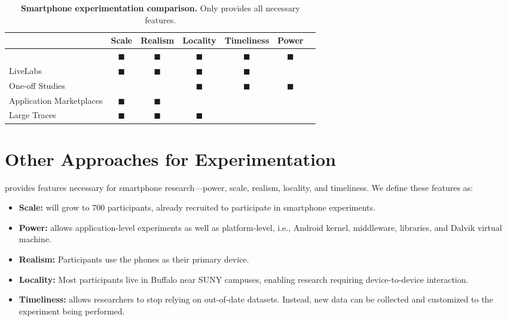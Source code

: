 \begin{table*}[t]
\begin{tabularx}{\textwidth}{Xcccccc}
& {\normalsize{\textbf{Scale}}} &
{\normalsize{\textbf{Realism}}} &
{\normalsize{\textbf{Locality}}} &
{\normalsize{\textbf{Timeliness}}} &
{\normalsize{\textbf{Power}}} \\
\toprule

{\large \PhoneLab{}}
& $\blacksquare$ & $\blacksquare$ & $\blacksquare$ & $\blacksquare$ & $\blacksquare$ \\
\toprule

LiveLabs &
$\blacksquare$ & $\blacksquare$ & $\blacksquare$ & $\blacksquare$ & & \\
\midrule

One-off Studies &
& & $\blacksquare$ & $\blacksquare$ & $\blacksquare$ \\
\midrule

Application Marketplaces &
$\blacksquare$ & $\blacksquare$ & & & \\
\midrule

Large Traces &
$\blacksquare$ & $\blacksquare$ & $\blacksquare$ & & \\
\bottomrule

\end{tabularx}
\caption{\textbf{Smartphone experimentation comparison.} Only \PhoneLab{}
provides all necessary features.}
\label{tab:comparison}
\end{table*}

\section{Other Approaches for Experimentation}
\label{sec-comparison}

\PhoneLab{} provides features necessary for smartphone research---power,
scale, realism, locality, and timeliness. We define these features as:

\begin{itemize}[nosep]
\item {\bf Scale:} \PhoneLab{} will grow to 700 participants, already
recruited to participate in smartphone experiments.
\item {\bf Power:} \PhoneLab{} allows application-level experiments as well
as platform-level, i.e., Android kernel, middleware, libraries, and Dalvik
virtual machine.
\item {\bf Realism:} Participants use the phones as their primary device.
\item {\bf Locality:} Most participants live in Buffalo near SUNY campuses,
enabling research requiring device-to-device interaction.
\item {\bf Timeliness:} \PhoneLab{} allows researchers to stop relying on
out-of-date datasets. Instead, new data can be collected and customized to
the experiment being performed.
\end{itemize}

